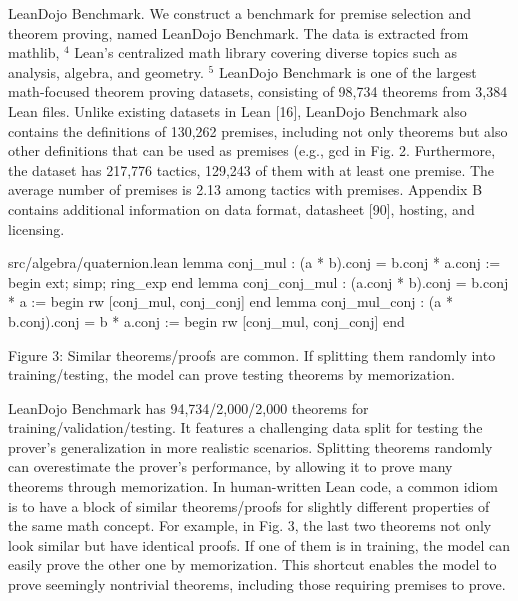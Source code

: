 \documentclass[
]{article}
\newenvironment{Shaded}{}{}
\newcommand{\NormalTok}[1]{#1}
\begin{document}
LeanDojo Benchmark. We construct a benchmark for premise selection and
theorem proving, named LeanDojo Benchmark. The data is extracted from
mathlib, \(^{4}\) Lean's centralized math library covering diverse
topics such as analysis, algebra, and geometry. \(^{5}\) LeanDojo
Benchmark is one of the largest math-focused theorem proving datasets,
consisting of 98,734 theorems from 3,384 Lean files. Unlike existing
datasets in Lean {[}16{]}, LeanDojo Benchmark also contains the
definitions of 130,262 premises, including not only theorems but also
other definitions that can be used as premises (e.g., gcd in Fig. 2.
Furthermore, the dataset has 217,776 tactics, 129,243 of them with at
least one premise. The average number of premises is 2.13 among tactics
with premises. Appendix B contains additional information on data
format, datasheet {[}90{]}, hosting, and licensing.

\begin{Shaded}
\begin{Highlighting}[]
\NormalTok{src/algebra/quaternion.lean}
\NormalTok{lemma conj\_mul : (a * b).conj = b.conj * a.conj := begin}
\NormalTok{    ext; simp; ring\_exp}
\NormalTok{end}
\NormalTok{lemma conj\_conj\_mul : (a.conj * b).conj = b.conj * a := begin}
\NormalTok{    rw [conj\_mul, conj\_conj]}
\NormalTok{end}
\NormalTok{lemma conj\_mul\_conj : (a * b.conj).conj = b * a.conj := begin}
\NormalTok{    rw [conj\_mul, conj\_conj]}
\NormalTok{end }
\end{Highlighting}
\end{Shaded}

Figure 3: Similar theorems/proofs are common. If splitting them randomly
into training/testing, the model can prove testing theorems by
memorization.

LeanDojo Benchmark has 94,734/2,000/2,000 theorems for
training/validation/testing. It features a challenging data split for
testing the prover's generalization in more realistic scenarios.
Splitting theorems randomly can overestimate the prover's performance,
by allowing it to prove many theorems through memorization. In
human-written Lean code, a common idiom is to have a block of similar
theorems/proofs for slightly different properties of the same math
concept. For example, in Fig. 3, the last two theorems not only look
similar but have identical proofs. If one of them is in training, the
model can easily prove the other one by memorization. This shortcut
enables the model to prove seemingly nontrivial theorems, including
those requiring premises to prove.
\end{document}
